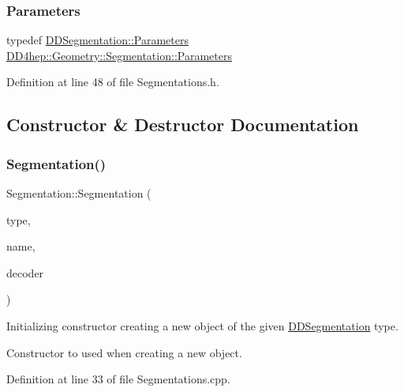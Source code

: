 \subsubsection{\texorpdfstring{Parameters}{Parameters}}
{\footnotesize\ttfamily typedef \hyperlink{namespace_d_d4hep_1_1_d_d_segmentation_af38026430ca0e1ef64acdfc898f5dd3d}{D\+D\+Segmentation\+::\+Parameters} \hyperlink{class_d_d4hep_1_1_geometry_1_1_segmentation_af7d9af7b574fa9039f44befc61b7e46f}{D\+D4hep\+::\+Geometry\+::\+Segmentation\+::\+Parameters}}



Definition at line 48 of file Segmentations.\+h.



\subsection{Constructor \& Destructor Documentation}
\hypertarget{class_d_d4hep_1_1_geometry_1_1_segmentation_a2f79df442e650659511590bcde2405b4}{}\label{class_d_d4hep_1_1_geometry_1_1_segmentation_a2f79df442e650659511590bcde2405b4} 
\subsubsection{\texorpdfstring{Segmentation()}{Segmentation()}\hspace{0.1cm}{\footnotesize\ttfamily [1/5]}}
{\footnotesize\ttfamily Segmentation\+::\+Segmentation (\begin{DoxyParamCaption}\item[{const std\+::string \&}]{type,  }\item[{const std\+::string \&}]{name,  }\item[{\hyperlink{class_d_d4hep_1_1_d_d_segmentation_1_1_bit_field64}{Bit\+Field64} $\ast$}]{decoder }\end{DoxyParamCaption})}



Initializing constructor creating a new object of the given \hyperlink{namespace_d_d4hep_1_1_d_d_segmentation}{D\+D\+Segmentation} type. 

Constructor to used when creating a new object. 

Definition at line 33 of file Segmentations.\+cpp.



